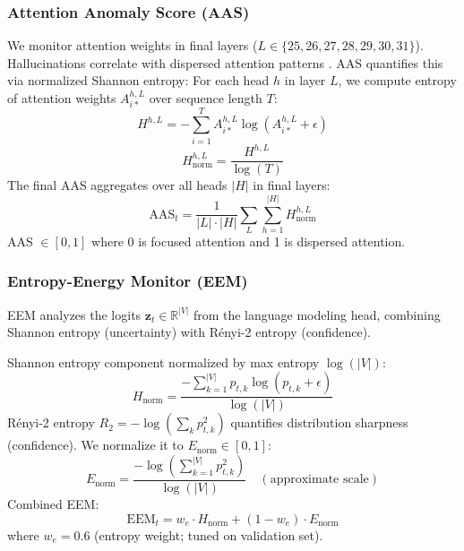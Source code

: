 \documentclass[conference]{IEEEtran}
\begin{document}
\subsubsection{Attention Anomaly Score (AAS)}
We monitor attention weights in final layers ($L \in \{25,26,27,28,29,30,31\}$). Hallucinations correlate with dispersed attention patterns \cite{hajji2025map}. AAS quantifies this via normalized Shannon entropy:
For each head $h$ in layer $L$, we compute entropy of attention weights $A^{h,L}_{i*}$ over sequence length $T$:
\begin{equation}
H^{h,L} = -\sum_{i=1}^{T} A^{h,L}_{i*} \log(A^{h,L}_{i*} + \epsilon)
\label{eq:entropy}
\end{equation}
\begin{equation}
H^{h,L}_{\text{norm}} = \frac{H^{h,L}}{\log(T)}
\label{eq:entropy_norm}
\end{equation}
The final AAS aggregates over all heads $|H|$ in final layers:
\begin{equation}
\text{AAS}_t = \frac{1}{|L| \cdot |H|} \sum_{L} \sum_{h=1}^{|H|} H^{h,L}_{\text{norm}}
\label{eq:aas}
\end{equation}
AAS $\in [0,1]$ where 0 is focused attention and 1 is dispersed attention.

\subsubsection{Entropy-Energy Monitor (EEM)}
EEM analyzes the logits $\mathbf{z}_t \in \mathbb{R}^{|V|}$ from the language modeling head, combining Shannon entropy (uncertainty) with R\'enyi-2 entropy (confidence). 

Shannon entropy component normalized by max entropy $\log(|V|)$:
\begin{equation}
H_{\text{norm}} = \frac{-\sum_{k=1}^{|V|} p_{t,k} \log(p_{t,k} + \epsilon)}{\log(|V|)}
\label{eq:shannon_norm}
\end{equation}
R\'enyi-2 entropy $R_2 = -\log(\sum_{k} p_{t,k}^2)$ quantifies distribution sharpness (confidence). We normalize it to $E_{\text{norm}} \in [0,1]$:
\begin{equation}
E_{\text{norm}} = \frac{-\log(\sum_{k=1}^{|V|} p_{t,k}^2)}{\log(|V|)} \quad (\text{approximate scale})
\label{eq:energy_norm}
\end{equation}
Combined EEM:
\begin{equation}
\text{EEM}_t = w_e \cdot H_{\text{norm}} + (1-w_e) \cdot E_{\text{norm}}
\label{eq:eem}
\end{equation}
where $w_e=0.6$ (entropy weight; tuned on validation set).
\end{document}
